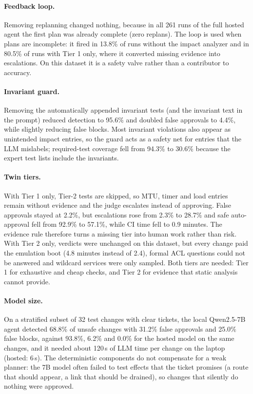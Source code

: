 \documentclass[pdflatex,iicol,sn-mathphys-num]{sn-jnl}%
\theoremstyle{thmstyletwo}%
\begin{document}
\paragraph{Feedback loop.} Removing replanning changed nothing, because in all 261 runs of the full hosted agent the first plan was already complete (zero replans). The loop is used when plans are incomplete: it fired in 13.8\% of runs without the impact analyzer and in 80.5\% of runs with Tier 1 only, where it converted missing evidence into escalations. On this dataset it is a safety valve rather than a contributor to accuracy.

\paragraph{Invariant guard.} Removing the automatically appended invariant tests (and the invariant text in the prompt) reduced detection to 95.6\% and doubled false approvals to 4.4\%, while slightly reducing false blocks. Most invariant violations also appear as unintended impact entries, so the guard acts as a safety net for entries that the LLM mislabels; required-test coverage fell from 94.3\% to 30.6\% because the expert test lists include the invariants.

\paragraph{Twin tiers.} With Tier 1 only, Tier-2 tests are skipped, so MTU, timer and load entries remain without evidence and the judge escalates instead of approving. False approvals stayed at 2.2\%, but escalations rose from 2.3\% to 28.7\% and safe auto-approval fell from 92.9\% to 57.1\%, while CI time fell to 0.9 minutes. The evidence rule therefore turns a missing tier into human work rather than risk. With Tier 2 only, verdicts were unchanged on this dataset, but every change paid the emulation boot (4.8 minutes instead of 2.4), formal ACL questions could not be answered and wildcard services were only sampled. Both tiers are needed: Tier 1 for exhaustive and cheap checks, and Tier 2 for evidence that static analysis cannot provide.

\paragraph{Model size.} On a stratified subset of 32 test changes with clear tickets, the local Qwen2.5-7B agent detected 68.8\% of unsafe changes with 31.2\% false approvals and 25.0\% false blocks, against 93.8\%, 6.2\% and 0.0\% for the hosted model on the same changes, and it needed about 120\,s of LLM time per change on the laptop (hosted: 6\,s). The deterministic components do not compensate for a weak planner: the 7B model often failed to test effects that the ticket promises (a route that should appear, a link that should be drained), so changes that silently do nothing were approved.
\end{document}
